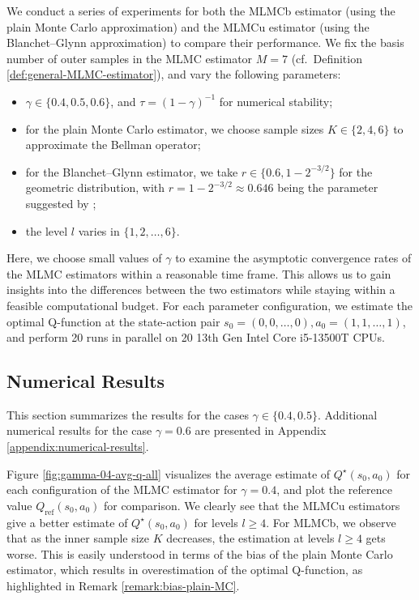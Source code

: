 \documentclass[11pt]{article}
\numberwithin{equation}{section}
\theoremstyle{definition}
\theoremstyle{remark}
\newcommand{\citet}{\cite}
\begin{document}
We conduct a series of experiments for both the MLMCb estimator (using the plain Monte Carlo approximation) and the MLMCu estimator (using the Blanchet–Glynn approximation) to compare their performance. We fix  the basis number of outer samples in the MLMC estimator $M=7$
(cf.~Definition \ref{def:general-MLMC-estimator}), and vary the following parameters:
\begin{itemize}
    \item $\gamma\in \{0.4,0.5,0.6\}$, and  $\tau = (1 - \gamma)^{-1}$ for numerical stability;
    \item for the plain Monte Carlo estimator, we choose sample sizes \( K \in \{2, 4, 6\} \) to approximate the Bellman operator;
    \item for the Blanchet--Glynn estimator, we take $r \in \{0.6, 1 - 2^{-3/2}\}$
    for the geometric distribution,
    with $r=1 - 2^{-3/2}\approx 0.646$ being the parameter suggested by \citet{blanchet2015unbiased};
    \item the level $l$ varies in $\{1,2, \ldots, 6\}$.
\end{itemize}
Here, we choose small values of $\gamma$ to examine the asymptotic convergence rates of the MLMC estimators within a reasonable time frame. This allows us to gain insights into the differences between the two estimators while staying within a feasible computational budget.
For each parameter configuration, we  estimate the optimal Q-function at the state-action pair $s_0 = (0 , 0 , \ldots,  0), a_0 = (1,  1 , \ldots,  1)$, and  perform 20 runs in parallel on 20 13th Gen Intel Core i5-13500T CPUs. 


\subsection{Numerical Results}
\label{subsection:results}


This section summarizes the results for the cases \( \gamma \in \{ 0.4,0.5\} \). Additional numerical results for the case  $\gamma = 0.6$  are presented in Appendix \ref{appendix:numerical-results}.


 Figure \ref{fig:gamma-04-avg-q-all}  visualizes the average estimate of $Q^\star(s_0,a_0)$ for each configuration of the MLMC estimator for $\gamma = 0.4$, and plot the reference value $Q_{\mathrm{ref}}(s_0,a_0)$ for comparison.
We clearly see that the MLMCu estimators give a better estimate of $Q^\star(s_0,a_0)$ for levels $l \geq 4$. For MLMCb, we observe that as the inner sample size $K$ decreases, the estimation at levels $l \geq 4$ gets worse. This is easily understood in terms of the bias of the plain Monte Carlo estimator, which results in overestimation of the optimal Q-function, as highlighted in Remark \ref{remark:bias-plain-MC}.
\end{document}
